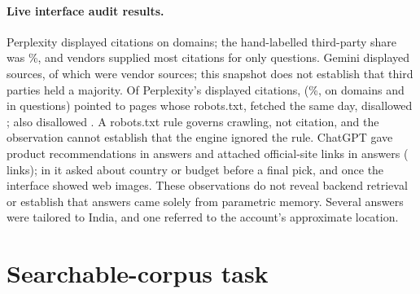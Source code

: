 \paragraph{Live interface audit results.} Perplexity displayed \AudPCites{} citations on \AudPDomains{} domains; the
hand-labelled third-party share was \AudPThirdPct\%, and vendors supplied most citations for only \AudPVendorMajority{}
questions. Gemini displayed \AudGSources{} sources, of which \AudGVendor{} were vendor sources; this snapshot does not
establish that third parties held a majority. Of Perplexity's displayed citations, \AudPBlocked{} (\AudPBlockedPct\%,
on \AudPBlockedDomains{} domains and in \AudPBlockedQ{} questions) pointed to pages whose robots.txt, fetched the same
day, disallowed ; \AudPBlockedUser{} also disallowed . A robots.txt rule governs
crawling, not citation, and the observation cannot establish that the engine ignored the rule. ChatGPT gave product
recommendations in \AudCTop{} answers and attached official-site links in \AudCLinksQW{} answers (\AudCLinks{} links);
in \AudCAskedW{} it asked about country or budget before a final pick, and once the interface showed web images. These
observations do not reveal backend retrieval or establish that answers came solely from parametric memory. Several
answers were tailored to India, and one referred to the account's approximate location.

\section{Searchable-corpus task}
\label{app:agentic}

